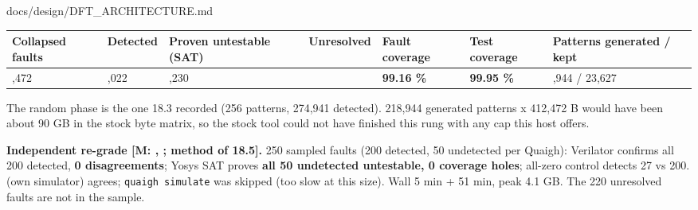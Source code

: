 \begin{relocated}{docs/design/DFT_ARCHITECTURE.md}
\begin{landscape}
{
\begin{longtable}[]{@{}
  >{\raggedright\arraybackslash}p{}
  >{\raggedright\arraybackslash}p{}
  >{\raggedright\arraybackslash}p{}
  >{\raggedright\arraybackslash}p{}
  >{\raggedright\arraybackslash}p{}
  >{\raggedright\arraybackslash}p{}
  >{\raggedright\arraybackslash}p{}@{}}
\toprule\noalign{}
\begin{minipage}[b]{\linewidth}\raggedright
Collapsed faults
\end{minipage} & \begin{minipage}[b]{\linewidth}\raggedright
Detected
\end{minipage} & \begin{minipage}[b]{\linewidth}\raggedright
Proven untestable (SAT)
\end{minipage} & \begin{minipage}[b]{\linewidth}\raggedright
Unresolved
\end{minipage} & \begin{minipage}[b]{\linewidth}\raggedright
Fault coverage
\end{minipage} & \begin{minipage}[b]{\linewidth}\raggedright
Test coverage
\end{minipage} & \begin{minipage}[b]{\linewidth}\raggedright
Patterns generated / kept
\end{minipage} \\
\midrule\noalign{}
\endhead
\bottomrule\noalign{}
\endlastfoot
412,472 & 409,022 & 3,230 & 220 & \textbf{99.16 \%} & \textbf{99.95 \%}
& 218,944 / 23,627 \\
\end{longtable}
}

\end{landscape}

The random phase is the one 18.3 recorded (256 patterns, 274,941
detected). 218,944 generated patterns x 412,472 B would have been about
90 GB in the stock byte matrix, so the stock tool could not have
finished this rung with any cap this host offers.

\textbf{Independent re-grade {[}M:
, ; method of
18.5{]}.} 250 sampled faults (200 detected, 50 undetected per Quaigh):
Verilator confirms all 200 detected, \textbf{0 disagreements}; Yosys SAT
proves \textbf{all 50 undetected untestable, 0 coverage holes}; all-zero
control detects 27 vs 200.  (own simulator) agrees;
\texttt{quaigh\ simulate} was skipped (too slow at this size). Wall 5
min + 51 min, peak 4.1 GB. The 220 unresolved faults are not in the
sample.


\end{relocated}

